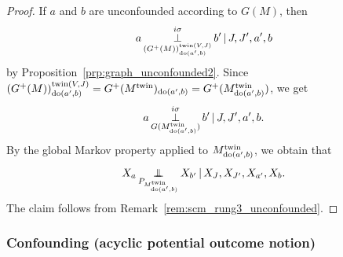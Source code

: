 \begin{proof}
  If $a$ and $b$ are unconfounded according to $G(M)$, then 
  $$a \operatorname*{\perp}^{i\sigma}_{(G^+(M))^{\mathrm{twin}(V,J)}_{\operatorname{do}(a',b)}} b' \operatorname*{|} J, J', a', b$$
  by Proposition~\ref{prp:graph_unconfounded2}.
  Since $(G^+(M))^{\mathrm{twin}(V,J)}_{\operatorname{do}(a',b)} = G^+(M^{\mathrm{twin}})_{\operatorname{do}(a',b)} = G^+(M^{\mathrm{twin}}_{\operatorname{do}(a',b)})$, we get
  $$a \operatorname*{\perp}^{i\sigma}_{G(M^{\mathrm{twin}}_{\operatorname{do}(a',b)})} b' \operatorname*{|} J, J', a', b.$$
  By the global Markov property applied to $M^{\mathrm{twin}}_{\operatorname{do}(a',b)}$, we obtain that
  $$X_a \operatorname*{\perp\mkern-11mu\perp}_{P_{M^{\mathrm{twin}}_{\operatorname{do}(a',b)}}} X_{b'} \operatorname*{|} X_J, X_{J'}, X_{a'}, X_b.$$
  The claim follows from Remark~\ref{rem:scm_rung3_unconfounded}.
\end{proof}

\subsubsection{Confounding (acyclic potential outcome notion)}

